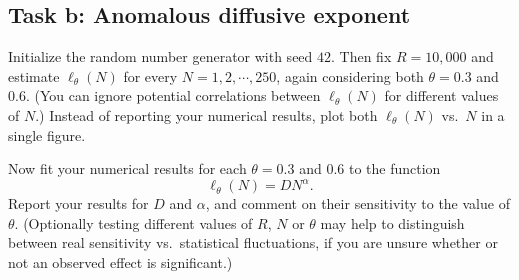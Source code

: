\documentclass[12 pt]{article} %
\newcommand{\al}{\ensuremath{\alpha} }
\newcommand{\showmarks}[1]{\rightline{\texttt{[#1 marks]}}} %
\begin{document}
\showmarks{12}

\subsection*{Task b: Anomalous diffusive exponent}
Initialize the random number generator with seed $42$.
Then fix $R = 10{,}000$ and estimate $\ell_{\theta}(N)$ for every $N = 1, 2, \cdots, 250$, again considering both $\theta = 0.3$ and $0.6$.
(You can ignore potential correlations between $\ell_{\theta}(N)$ for different values of $N$.)
Instead of reporting your numerical results, plot both $\ell_{\theta}(N)$ vs.\ $N$ in a single figure.

\showmarks{8}

Now fit your numerical results for each $\theta = 0.3$ and $0.6$ to the function
\begin{equation*}
  \ell_{\theta}(N) = D N^{\al}.
\end{equation*}
Report your results for $D$ and $\al$, and comment on their sensitivity to the value of $\theta$.
(Optionally testing different values of $R$, $N$ or $\theta$ may help to distinguish between real sensitivity vs.\ statistical fluctuations, if you are unsure whether or not an observed effect is significant.)

\showmarks{10}



\end{document}
